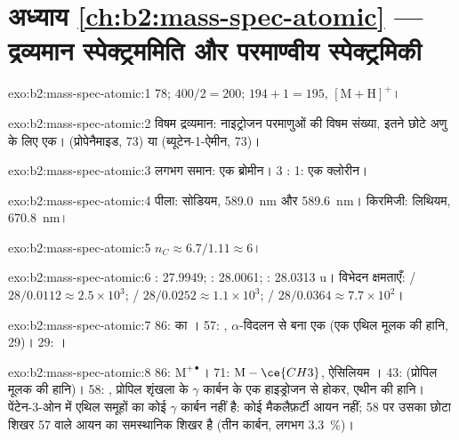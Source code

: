 \section*{अध्याय \ref{ch:b2:mass-spec-atomic} --- द्रव्यमान स्पेक्ट्रममिति और परमाण्वीय स्पेक्ट्रमिकी}

\begin{solution}{exo:b2:mass-spec-atomic:1}
78; $400/2 = 200$; $194 + 1 = 195$, $[\mathrm M + \mathrm H]^+$।
\end{solution}

\begin{solution}{exo:b2:mass-spec-atomic:2}
विषम द्रव्यमान: नाइट्रोजन परमाणुओं की विषम संख्या, इतने छोटे अणु के लिए एक।  (प्रोपेनैमाइड, 73)
या  (ब्यूटेन-1-ऐमीन, 73)।
\end{solution}

\begin{solution}{exo:b2:mass-spec-atomic:3}
लगभग समान: एक ब्रोमीन। 3 : 1: एक क्लोरीन।
\end{solution}

\begin{solution}{exo:b2:mass-spec-atomic:4}
पीला: सोडियम, \qty{589.0}{nm} और \qty{589.6}{nm}। किरमिजी: लिथियम, \qty{670.8}{nm}।
\end{solution}

\begin{solution}{exo:b2:mass-spec-atomic:5}
$n_C \approx 6.7/1.11 \approx 6$।
\end{solution}

\begin{solution}{exo:b2:mass-spec-atomic:6}
: 27.9949; : 28.0061; : 28.0313 u। विभेदन क्षमताएँ: / $28/0.0112
\approx 2.5 \times 10^3$; / $28/0.0252 \approx 1.1 \times 10^3$; /
$28/0.0364 \approx 7.7 \times 10^2$।
\end{solution}

\begin{solution}{exo:b2:mass-spec-atomic:7}
86:  का । 57: , $\alpha$-विदलन से बना एक  (एक एथिल
मूलक की हानि, 29)। 29: ।
\end{solution}

\begin{solution}{exo:b2:mass-spec-atomic:8}
86: $\mathrm M^{+\bullet}$। 71: $\mathrm M - \ce{CH3}$, ऐसिलियम । 43: 
(प्रोपिल मूलक की हानि)। 58: , प्रोपिल शृंखला के
$\gamma$ कार्बन के एक हाइड्रोजन से होकर, एथीन की हानि। पेंटेन-3-ओन में एथिल समूहों का कोई $\gamma$ कार्बन नहीं है: कोई
मैकलैफ़र्टी आयन नहीं; 58 पर उसका छोटा शिखर 57 वाले आयन का  समस्थानिक शिखर है (तीन कार्बन,
लगभग 3.3~\%)।
\end{solution}

